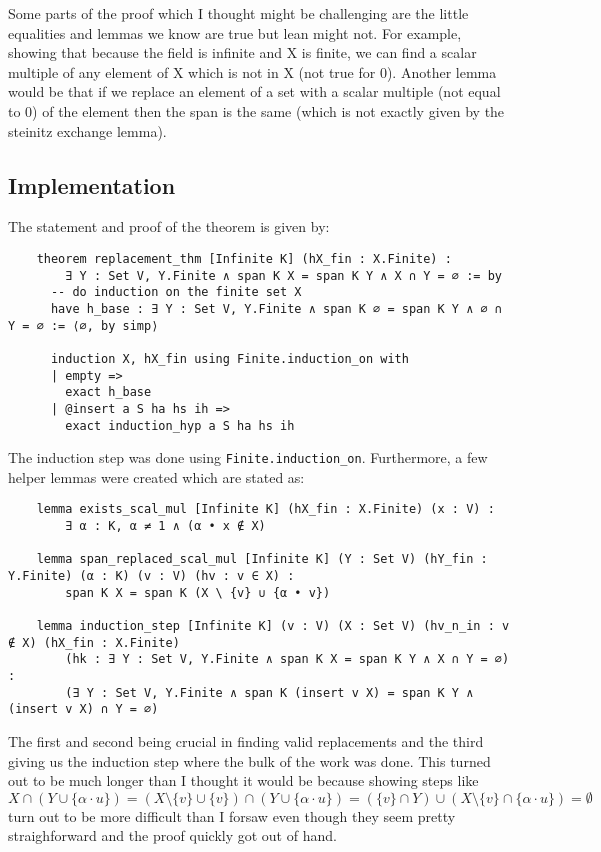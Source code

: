 \documentclass{article}
\begin{document}
Some parts of the proof which I thought might be challenging are the little equalities and lemmas we know are true but lean might not. For example, showing that because the field is infinite and X is finite, we can find a scalar multiple of any element of X which is not in X (not true for 0). Another lemma would be that if we replace an element of a set with a scalar multiple (not equal to 0) of the element then the span is the same (which is not exactly given by the steinitz exchange lemma).

\subsection{Implementation}

The statement and proof of the theorem is given by:
\begin{lstlisting}
    theorem replacement_thm [Infinite K] (hX_fin : X.Finite) :
        ∃ Y : Set V, Y.Finite ∧ span K X = span K Y ∧ X ∩ Y = ∅ := by
      -- do induction on the finite set X
      have h_base : ∃ Y : Set V, Y.Finite ∧ span K ∅ = span K Y ∧ ∅ ∩ Y = ∅ := ⟨∅, by simp⟩
    
      induction X, hX_fin using Finite.induction_on with
      | empty =>
        exact h_base
      | @insert a S ha hs ih =>
        exact induction_hyp a S ha hs ih
\end{lstlisting}

The induction step was done using \texttt{Finite.induction\_on}. Furthermore, a few helper lemmas were created which are stated as:

\begin{lstlisting}
    lemma exists_scal_mul [Infinite K] (hX_fin : X.Finite) (x : V) :
        ∃ α : K, α ≠ 1 ∧ (α • x ∉ X)
    
    lemma span_replaced_scal_mul [Infinite K] (Y : Set V) (hY_fin : Y.Finite) (α : K) (v : V) (hv : v ∈ X) :
        span K X = span K (X \ {v} ∪ {α • v})
    
    lemma induction_step [Infinite K] (v : V) (X : Set V) (hv_n_in : v ∉ X) (hX_fin : X.Finite)
        (hk : ∃ Y : Set V, Y.Finite ∧ span K X = span K Y ∧ X ∩ Y = ∅) :
        (∃ Y : Set V, Y.Finite ∧ span K (insert v X) = span K Y ∧ (insert v X) ∩ Y = ∅)
\end{lstlisting}

The first and second being crucial in finding valid replacements and the third giving us the induction step where the bulk of the work was done. This turned out to be much longer than I thought it would be because showing steps like \(X \cap (Y \cup \{\alpha \cdot u\}) = (X\setminus\{v\} \cup \{v\})\cap (Y \cup \{\alpha \cdot u\}) = (\{v\} \cap Y) \cup ( X\setminus\{v\} \cap \{\alpha \cdot u\})  = \emptyset\) turn out to be more difficult than I forsaw even though they seem pretty straighforward and the proof quickly got out of hand.\\
\end{document}

